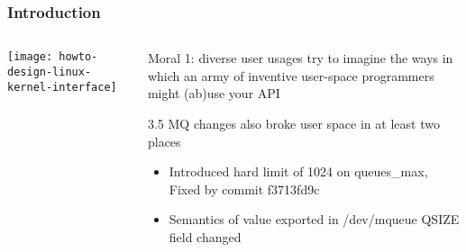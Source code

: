 \begin{frame}[plain]
	\frametitle{Introduction}
	
	
	
	\begin{columns}
		
		\begin{column}{.4\textwidth}
			
			\texttt{[image: howto-design-linux-kernel-interface]}
			
		\end{column}
		
		\begin{column}{.6\textwidth}
			\LARGE
			\begin{block}{Moral 1: diverse user usages}
				try to imagine the ways
				in which an army of inventive
				user-space programmers might
				(ab)use your API
				
			\end{block} 
		\normalsize
		3.5 MQ changes also
		broke user space
		in at least two places
		\begin{itemize}
			\item Introduced hard limit of 1024 on queues\_max, Fixed by commit f3713fd9c
			\item Semantics of value exported in /dev/mqueue QSIZE field
			changed
			
		\end{itemize}
		\end{column}
		
		
	\end{columns}
	
	
\end{frame}



